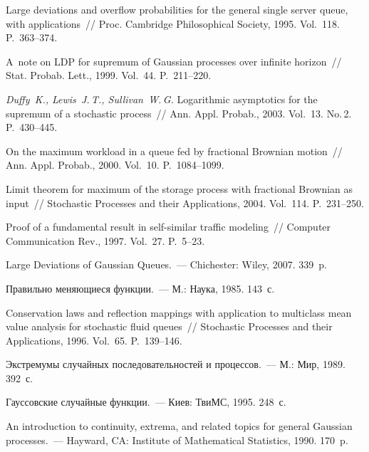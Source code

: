 \begin{multicols}{2}
{{\begin{thebibliography}{99}
 Large deviations and overflow
probabilities for the general single server queue, with applications~// 
Proc. Cambridge Philosophical Society, 1995.
Vol.~118. P.~363--374.

 A~note on LDP for supremum of Gaussian processes
over infinite horizon~// Stat. Probab. Lett., 1999. Vol.~44.
P.~211--220.

\textit{Duffy~K., Lewis~J.\,T., Sullivan~W.\,G.} Logarithmic
asymptotics for the supremum of a stochastic process~// Ann. Appl. Probab., 2003. Vol.~13. No.\,2. P.~430--445.

 On the maximum workload in a queue fed
by fractional Brownian motion~// Ann. Appl. Probab., 2000. Vol.~10.
P.~1084--1099.

 Limit theorem for maximum
of the storage process with fractional Brownian as input~// 
Stochastic Processes and their Applications, 2004. Vol.~114.
P.~231--250.

 Proof of a
fundamental result in self-similar traffic modeling~// Computer
Communication Rev., 1997. Vol.~27. P.~5--23.

 Large Deviations of Gaussian Queues.~---
Chichester: Wiley, 2007. 339~p.

 Правильно меняющиеся функции.~--- М.: Наука, 1985.
143~с.

Conservation laws and reflection mappings with application to
multiclass mean value analysis for stochastic fluid queues~// 
Stochastic Processes and their Applications, 1996. Vol.~65.
P.~139--146.

 Экстремумы случайных
последовательностей и процессов.~--- М.: Мир, 1989. 392~с.

 Гауссовские случайные функции.~--- Киев: ТвиМС, 1995. 248~с.

\label{end\stat}

 An introduction to continuity, extrema, and
related topics for general Gaussian processes.~--- Hayward, CA: Institute of
Mathematical Statistics, 1990. 170~p.
 \end{thebibliography}
}
}


\end{multicols}